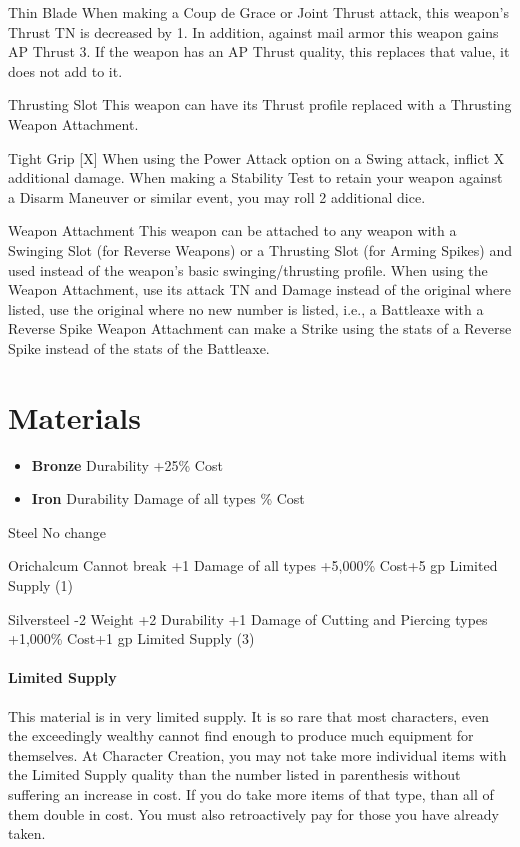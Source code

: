 \documentclass[oneside,11pt,english]{book}
\begin{document}
Thin Blade When making a Coup de Grace or Joint Thrust attack, this weapon’s Thrust TN is decreased by 1. In addition, against mail armor this weapon gains AP Thrust 3. If the weapon has an AP Thrust quality, this replaces that value, it does not add to it.

Thrusting Slot This weapon can have its Thrust profile replaced with a Thrusting Weapon Attachment.

Tight Grip [X] When using the Power Attack option on a Swing attack, inflict X additional damage. When making a Stability Test to retain your weapon against a Disarm Maneuver or similar event, you may roll 2 additional dice.

Weapon Attachment This weapon can be attached to any weapon with a Swinging Slot (for Reverse Weapons) or a Thrusting Slot (for Arming Spikes) and used instead of the weapon’s basic swinging/thrusting profile. When using the Weapon Attachment, use its attack TN and Damage instead of the original where listed, use the original where no new number is listed, i.e., a Battleaxe with a Reverse Spike Weapon Attachment can make a Strike using the stats of a Reverse Spike instead of the stats of the Battleaxe.

\section{Materials}
\begin{itemize}
	\item [] \textbf{Bronze}
	 Durability
	\subitem +25\% Cost
\end{itemize}
\begin{itemize}
\item [] \textbf{Iron}
 Durability
 Damage of all types
\% Cost
\end{itemize}

Steel
No change

Orichalcum
Cannot break
+1 Damage of all types
+5,000\% Cost+5 gp
Limited Supply (1)

Silversteel
-2 Weight
+2 Durability
+1 Damage of Cutting and Piercing types
+1,000\% Cost+1 gp
Limited Supply (3)

\paragraph{Limited Supply}
This material is in very limited supply. It is so rare that most characters, even the exceedingly wealthy cannot find enough to produce much equipment for themselves. At Character Creation, you may not take more individual items with the Limited Supply quality than the number listed in parenthesis without suffering an increase in cost. If you do take more items of that type, than all of them double in cost. You must also retroactively pay for those you have already taken.
\end{document}

